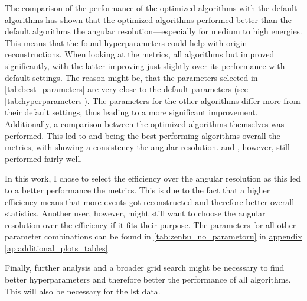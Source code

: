 The comparison of the performance of the optimized algorithms with the default algorithms has shown that
the optimized algorithms performed better than the default algorithms \wrt the angular resolution---especially
for medium to high energies. This means that the found hyperparameters could help with origin reconstructions. When looking at the metrics,
all algorithms but \fact{} improved significantly, with the latter improving just slightly over its performance with default settings.
The reason might be, that the parameters selected in \autoref{tab:best_parameters} are very close to the default parameters
(see \autoref{tab:hyperparameters}). The parameters for the other algorithms differ more from their default settings,
thus leading to a more significant improvement. Additionally, a comparison between the optimized algorithms themselves was performed. This led to \fact{} and \mars{}
being the best-performing algorithms overall \wrt the metrics, with \mars{} showing a consistency \wrt the
angular resolution. \tailcuts{} and \tcc{}, however, still performed fairly well.

In this work, I chose to select the efficiency over the angular resolution as this led to a better
performance \wrt the metrics. This is due to the fact that a higher efficiency means
that more events got reconstructed and therefore better overall statistics. Another user, however,
might still want to choose the angular resolution over the efficiency if it fits their purpose.
The parameters for all other parameter combinations can be found in \autoref{tab:zenbu_no_parametoru}
in \hyperref[ap:additional_plots_tables]{appendix \ref{ap:additional_plots_tables}}.

Finally, further analysis and a broader grid search might be necessary to find better hyperparameters
and therefore better the performance of all algorithms. This will also be necessary for the \gls{lst} data.

